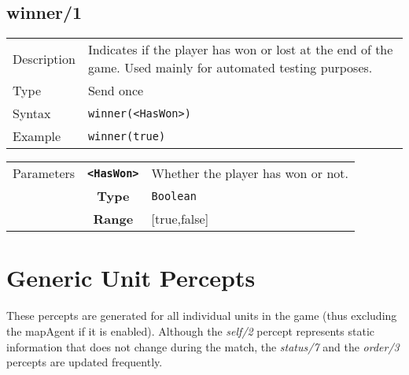 \subsection{winner/1}
\begin{tabularx}{\textwidth}{lX}
 Description & Indicates if the player has won or lost at the end of the game. Used mainly for automated testing purposes. \\
 Type & Send once \\
 Syntax &  \verb|winner(<HasWon>)| \\
 Example & \verb|winner(true)|   \\
 \end{tabularx}
 \begin{tabularx}{\textwidth}{l | c | p{8cm}|}
 \cline{2-3}
  Parameters & \textbf{\verb|<HasWon>|} & Whether the player has won or not. \\
             & \textbf{Type} & \verb|Boolean| \\
            & \textbf{Range} & [true,false] \\
            \cline{2-3}
 \end{tabularx}
 
\newpage
 
\section{Generic Unit Percepts}
These percepts are generated for all individual units in the game (thus excluding the mapAgent if it is enabled). Although the \textit{self/2} percept represents static information that does not change during the match, the \textit{status/7} and the \textit{order/3} percepts are updated frequently.

